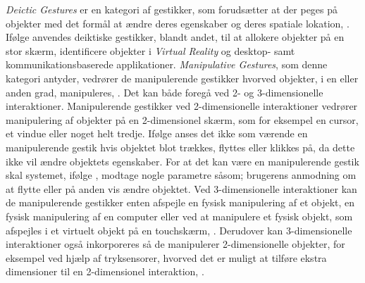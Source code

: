 %  
\textit{Deictic Gestures} er en kategori af gestikker, som forudsætter at der peges på objekter med det formål at ændre deres egenskaber og deres spatiale lokation, \parencite[s. 4]{PDF:ATaxonomyOfGestures}. Ifølge \textcite[ss. 4-5]{PDF:ATaxonomyOfGestures} anvendes deiktiske gestikker, blandt andet, til at allokere objekter på en stor skærm, identificere objekter i \textit{Virtual Reality} og desktop- samt kommunikationsbaserede applikationer. \blankline
%
\textit{Manipulative Gestures}, som denne kategori antyder, vedrører de manipulerende gestikker hvorved objekter, i en eller anden grad, manipuleres, \parencite[s. 5]{PDF:ATaxonomyOfGestures}. Det kan både foregå ved 2- og 3-dimensionelle interaktioner. Manipulerende gestikker ved 2-dimensionelle interaktioner vedrører manipulering af objekter på en 2-dimensionel skærm, som for eksempel en cursor, et vindue eller noget helt tredje. Ifølge \textcite[s. 5]{PDF:ATaxonomyOfGestures} anses det ikke som værende en manipulerende gestik hvis objektet blot trækkes, flyttes eller klikkes på, da dette ikke vil ændre objektets egenskaber. For at det kan være en manipulerende gestik skal systemet, ifølge \textcite[s. 5]{PDF:ATaxonomyOfGestures}, modtage nogle parametre såsom; brugerens anmodning om at flytte eller på anden vis ændre objektet. Ved 3-dimensionelle interaktioner kan de manipulerende gestikker enten afspejle en fysisk manipulering af et objekt, en fysisk manipulering af en computer eller ved at manipulere et fysisk objekt, som afspejles i et virtuelt objekt på en touchskærm, \parencite[s. 6]{PDF:ATaxonomyOfGestures}. Derudover kan 3-dimensionelle interaktioner også inkorporeres så de manipulerer 2-dimensionelle objekter, for eksempel ved hjælp af tryksensorer, hvorved det er muligt at tilføre ekstra dimensioner til en 2-dimensionel interaktion, \parencite[s. 5]{PDF:ATaxonomyOfGestures}. 

